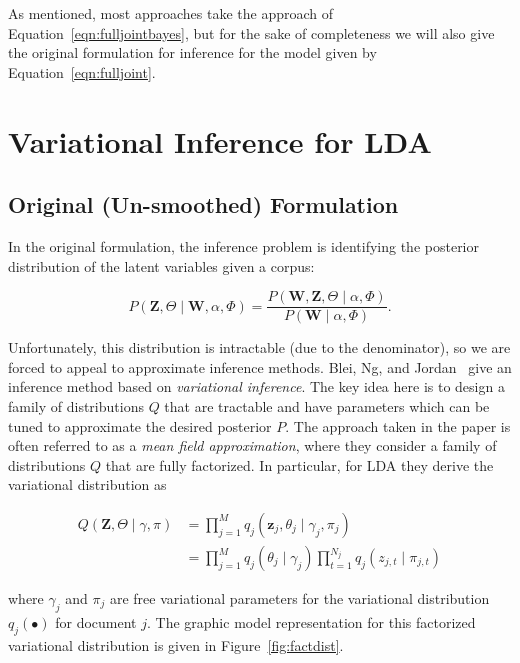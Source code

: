 \documentclass[11pt]{article}
\begin{document}
As mentioned, most approaches take the approach of
Equation~\ref{eqn:fulljointbayes}, but for the sake of completeness we will
also give the original formulation for inference for the model given by
Equation~\ref{eqn:fulljoint}.

\section{Variational Inference for LDA}
\subsection{Original (Un-smoothed) Formulation}

In the original formulation, the inference problem is identifying the
posterior distribution of the latent variables given a corpus:

\begin{equation}
  P(\mathbf{Z}, \Theta \mid \textbf{W}, \alpha, \Phi) = \frac{P(\mathbf{W}, \mathbf{Z},
  \Theta \mid \alpha, \Phi)}{P(\mathbf{W} \mid \alpha, \Phi)}.
\end{equation}

Unfortunately, this distribution is intractable (due to the denominator),
so we are forced to appeal to approximate inference methods. Blei, Ng, and
Jordan~\cite{Blei:2003:LDA} give an inference method based on
\emph{variational inference}. The key idea here is to design a family of
distributions $Q$ that are tractable and have parameters which can be tuned
to approximate the desired posterior $P$. The approach taken in the paper
is often referred to as a \emph{mean field approximation}, where they
consider a family of distributions $Q$ that are fully factorized. In
particular, for LDA they derive the variational distribution as

\begin{align}
  Q(\mathbf{Z}, \Theta \mid \gamma, \pi)
  &= \prod_{j=1}^M q_j(\mathbf{z}_j, \theta_j \mid \gamma_j, \pi_j)\\
  &= \prod_{j=1}^M q_j(\theta_j \mid
  \gamma_j) \prod_{t=1}^{N_j} q_j(z_{j,t} \mid \pi_{j,t})
\end{align}

where $\gamma_j$ and $\pi_{j}$ are free variational parameters for the
variational distribution $q_j(\bullet)$ for document $j$. The graphic model
representation for this factorized variational distribution is given in
Figure~\ref{fig:factdist}.
\end{document}
